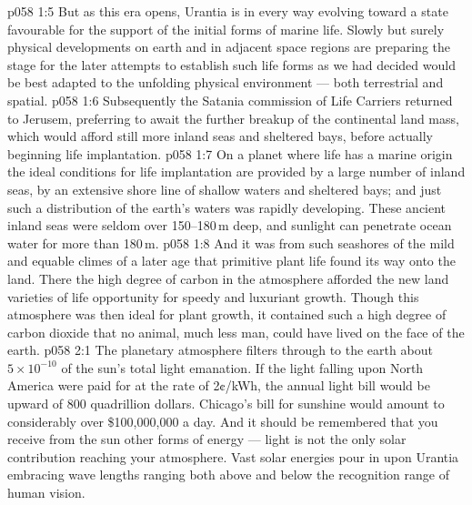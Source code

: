 \vs p058 1:5 But as this era opens, Urantia is in every way evolving toward a state favourable for the support of the initial forms of marine life. Slowly but surely physical developments on earth and in adjacent space regions are preparing the stage for the later attempts to establish such life forms as we had decided would be best adapted to the unfolding physical environment --- both terrestrial and spatial.
\vs p058 1:6 Subsequently the Satania commission of Life Carriers returned to Jerusem, preferring to await the further breakup of the continental land mass, which would afford still more inland seas and sheltered bays, before actually beginning life implantation.
\vs p058 1:7 \pc On a planet where life has a marine origin the ideal conditions for life implantation are provided by a large number of inland seas, by an extensive shore line of shallow waters and sheltered bays; and just such a distribution of the earth’s waters was rapidly developing. These ancient inland seas were seldom over 150--180\,m deep, and sunlight can penetrate ocean water for more than 180\,m.
\vs p058 1:8 And it was from such seashores of the mild and equable climes of a later age that primitive plant life found its way onto the land. There the high degree of carbon in the atmosphere afforded the new land varieties of life opportunity for speedy and luxuriant growth. Though this atmosphere was then ideal for plant growth, it contained such a high degree of carbon dioxide that no animal, much less man, could have lived on the face of the earth.
\vs p058 2:1 The planetary atmosphere filters through to the earth about $5 \times 10^{-10}$ of the sun’s total light emanation. If the light falling upon North America were paid for at the rate of 2¢/kWh, the annual light bill would be upward of 800 quadrillion dollars. Chicago’s bill for sunshine would amount to considerably over \$100,000,000 a day. And it should be remembered that you receive from the sun other forms of energy --- light is not the only solar contribution reaching your atmosphere. Vast solar energies pour in upon Urantia embracing wave lengths ranging both above and below the recognition range of human vision.
